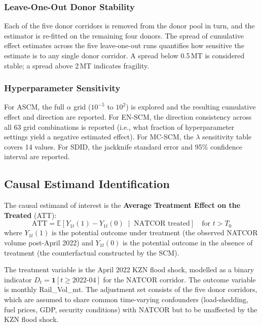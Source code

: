 \subsubsection{Leave-One-Out Donor Stability}
\label{sec:loo}

Each of the five donor corridors is removed from the donor pool in
turn, and the estimator is re-fitted on the remaining four donors.
The spread of cumulative effect estimates across the five
leave-one-out runs quantifies how sensitive the estimate is to
any single donor corridor.
A spread below 0.5\,MT is considered stable; a spread above 2\,MT
indicates fragility.

\subsubsection{Hyperparameter Sensitivity}
\label{sec:sensitivity}

For ASCM, the full $\alpha$ grid ($10^{-5}$ to $10^2$) is explored
and the resulting cumulative effect and direction are reported.
For EN-SCM, the direction consistency across all 63 grid combinations
is reported (i.e., what fraction of hyperparameter settings yield a
negative estimated effect).
For MC-SCM, the $\lambda$ sensitivity table covers 14 values.
For SDID, the jackknife standard error and 95\% confidence interval
are reported.

\subsection{Causal Estimand Identification}
\label{sec:estimand}

The causal estimand of interest is the \textbf{Average Treatment
Effect on the Treated} (ATT):
\begin{equation}
  \text{ATT} = \mathbb{E}\!\left[Y_{1t}(1) - Y_{1t}(0)
    \;\middle|\; \text{NATCOR treated}\right]
    \quad \text{for } t > T_0
\end{equation}
where $Y_{1t}(1)$ is the potential outcome under treatment (the
observed NATCOR volume post-April 2022) and $Y_{1t}(0)$ is the
potential outcome in the absence of treatment (the counterfactual
constructed by the SCM).

The treatment variable is the April 2022 KZN flood shock, modelled
as a binary indicator $D_t = \mathbf{1}[t \geq \text{2022-04}]$
for the NATCOR corridor.
The outcome variable is monthly Rail\_Vol\_mt.
The adjustment set consists of the five donor corridors, which are
assumed to share common time-varying confounders (load-shedding,
fuel prices, GDP, security conditions) with NATCOR but to be
unaffected by the KZN flood shock.

